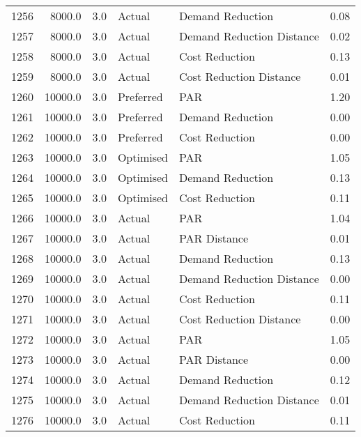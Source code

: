 \begin{longtable}{lrrllr}
1256 &       8000.0 &     3.0 &         Actual &           Demand Reduction &   0.08 \\
1257 &       8000.0 &     3.0 &         Actual &  Demand Reduction Distance &   0.02 \\
1258 &       8000.0 &     3.0 &         Actual &             Cost Reduction &   0.13 \\
1259 &       8000.0 &     3.0 &         Actual &    Cost Reduction Distance &   0.01 \\
1260 &      10000.0 &     3.0 &      Preferred &                        PAR &   1.20 \\
1261 &      10000.0 &     3.0 &      Preferred &           Demand Reduction &   0.00 \\
1262 &      10000.0 &     3.0 &      Preferred &             Cost Reduction &   0.00 \\
1263 &      10000.0 &     3.0 &      Optimised &                        PAR &   1.05 \\
1264 &      10000.0 &     3.0 &      Optimised &           Demand Reduction &   0.13 \\
1265 &      10000.0 &     3.0 &      Optimised &             Cost Reduction &   0.11 \\
1266 &      10000.0 &     3.0 &         Actual &                        PAR &   1.04 \\
1267 &      10000.0 &     3.0 &         Actual &               PAR Distance &   0.01 \\
1268 &      10000.0 &     3.0 &         Actual &           Demand Reduction &   0.13 \\
1269 &      10000.0 &     3.0 &         Actual &  Demand Reduction Distance &   0.00 \\
1270 &      10000.0 &     3.0 &         Actual &             Cost Reduction &   0.11 \\
1271 &      10000.0 &     3.0 &         Actual &    Cost Reduction Distance &   0.00 \\
1272 &      10000.0 &     3.0 &         Actual &                        PAR &   1.05 \\
1273 &      10000.0 &     3.0 &         Actual &               PAR Distance &   0.00 \\
1274 &      10000.0 &     3.0 &         Actual &           Demand Reduction &   0.12 \\
1275 &      10000.0 &     3.0 &         Actual &  Demand Reduction Distance &   0.01 \\
1276 &      10000.0 &     3.0 &         Actual &             Cost Reduction &   0.11 \\

\end{longtable}
